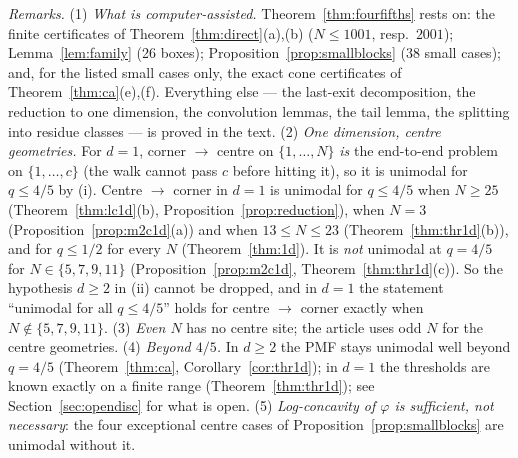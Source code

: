 \documentclass[11pt,a4paper]{article}
\theoremstyle{definition}
\begin{document}
\emph{Remarks.} (1) \emph{What is computer-assisted.} Theorem~\ref{thm:fourfifths} rests on: the finite certificates of Theorem~\ref{thm:direct}(a),(b) ($N\le1001$, resp.\ $2001$); Lemma~\ref{lem:family} (26 boxes); Proposition~\ref{prop:smallblocks} (38 small cases); and, for the listed small cases only, the exact cone certificates of Theorem~\ref{thm:ca}(e),(f). Everything else --- the last-exit decomposition, the reduction to one dimension, the convolution lemmas, the tail lemma, the splitting into residue classes --- is proved in the text.
(2) \emph{One dimension, centre geometries.} For $d=1$, corner $\to$ centre on $\{1,\dots,N\}$ \emph{is} the end-to-end problem on $\{1,\dots,c\}$ (the walk cannot pass $c$ before hitting it), so it is unimodal for $q\le4/5$ by (i). Centre $\to$ corner in $d=1$ is unimodal for $q\le4/5$ when $N\ge25$ (Theorem~\ref{thm:lc1d}(b), Proposition~\ref{prop:reduction}), when $N=3$ (Proposition~\ref{prop:m2c1d}(a)) and when $13\le N\le23$ (Theorem~\ref{thm:thr1d}(b)), and for $q\le1/2$ for every $N$ (Theorem~\ref{thm:1d}). It is \emph{not} unimodal at $q=4/5$ for $N\in\{5,7,9,11\}$ (Proposition~\ref{prop:m2c1d}, Theorem~\ref{thm:thr1d}(c)). So the hypothesis $d\ge2$ in (ii) cannot be dropped, and in $d=1$ the statement ``unimodal for all $q\le4/5$'' holds for centre $\to$ corner exactly when $N\notin\{5,7,9,11\}$.
(3) \emph{Even $N$} has no centre site; the article uses odd $N$ for the centre geometries.
(4) \emph{Beyond $4/5$.} In $d\ge2$ the PMF stays unimodal well beyond $q=4/5$ (Theorem~\ref{thm:ca}, Corollary~\ref{cor:thr1d}); in $d=1$ the thresholds are known exactly on a finite range (Theorem~\ref{thm:thr1d}); see Section~\ref{sec:opendisc} for what is open.
(5) \emph{Log-concavity of $\varphi$ is sufficient, not necessary}: the four exceptional centre cases of Proposition~\ref{prop:smallblocks} are unimodal without it.
\end{document}
